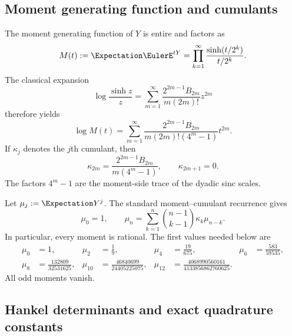 \documentclass[11pt]{article}
\numberwithin{equation}{section}
\theoremstyle{definition}
\theoremstyle{remark}
\begin{document}
\subsection{Moment generating function and cumulants}

The moment generating function of $Y$ is entire and factors as
\begin{equation}
 M(t):=\Expectation\EulerE^{tY}
 =\prod_{k=1}^{\infty}\frac{\sinh(t/2^k)}{t/2^k}.
 \label{p1:eq:MGF}
\end{equation}
The classical expansion
\begin{equation}
 \log\frac{\sinh z}{z}
 =\sum_{m=1}^{\infty}
 \frac{2^{2m-1}B_{2m}}{m(2m)!}z^{2m}
 \label{p1:eq:logsinh}
\end{equation}
therefore yields
\begin{equation}
 \boxed{
 \log M(t)=\sum_{m=1}^{\infty}
 \frac{2^{2m-1}B_{2m}}{m(2m)!(4^m-1)}t^{2m}.}
 \label{p1:eq:logM}
\end{equation}
If $\kappa_j$ denotes the $j$th cumulant, then
\begin{equation}
 \boxed{
 \kappa_{2m}=\frac{2^{2m-1}B_{2m}}{m(4^m-1)},
 \qquad
 \kappa_{2m+1}=0.}
 \label{p1:eq:cumulants}
\end{equation}
The factors $4^m-1$ are the moment-side trace of the dyadic sinc scales.

Let $\mu_j:=\Expectation Y^j$.  The standard moment--cumulant recurrence gives
\begin{equation}
 \mu_0=1,
 \qquad
 \mu_n=\sum_{k=1}^{n}\binom{n-1}{k-1}\kappa_k\mu_{n-k}.
 \label{p1:eq:moment-recurrence}
\end{equation}
In particular, every moment is rational.  The first values needed below are
\begin{align}
 \mu_0&=1,&
 \mu_2&=\frac19,&
 \mu_4&=\frac{19}{675},&
 \mu_6&=\frac{583}{59535},\label{p1:eq:moments-low}\\
 \mu_8&=\frac{132809}{32531625},&
 \mu_{10}&=\frac{46840699}{24405225075},&
 \mu_{12}&=\frac{4068990560161}{4133856862760625}.\nonumber
\end{align}
All odd moments vanish.

\subsection{Hankel determinants and exact quadrature constants}
\end{document}
